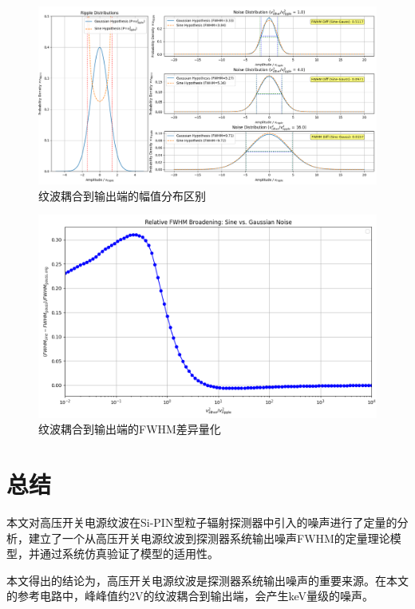 \documentclass[twocolumn]{ctexart}
\begin{document}
\begin{figure}[htbp]
    \centering
    \includegraphics[width=\linewidth]{./non_gausian_effect.png}
    \caption{纹波耦合到输出端的幅值分布区别}
    \label{fig:non_gausian_effect}
\end{figure}

\begin{figure}[htbp]
    \centering
    \includegraphics[width=\linewidth]{./non_gausian_effect_num.png}
    \caption{纹波耦合到输出端的FWHM差异量化}
    \label{fig:non_gausian_effect_num}
\end{figure}


\section{总结}

本文对高压开关电源纹波在Si-PIN型粒子辐射探测器中引入的噪声进行了定量的分析，建立了一个从高压开关电源纹波到探测器系统输出噪声FWHM的定量理论模型，并通过系统仿真验证了模型的适用性。

本文得出的结论为，高压开关电源纹波是探测器系统输出噪声的重要来源。在本文的参考电路中，峰峰值约2V的纹波耦合到输出端，会产生keV量级的噪声。
\end{document}

